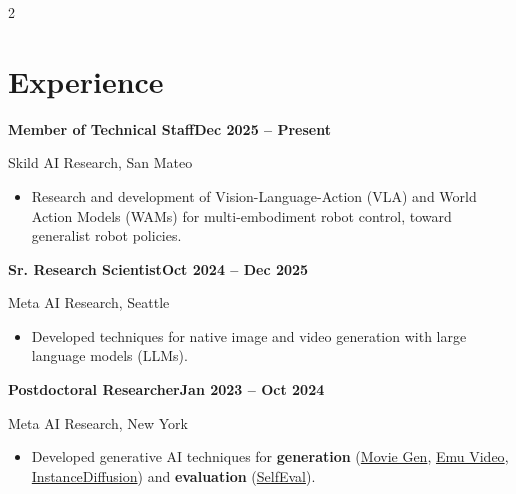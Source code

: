 \documentclass[10pt, letterpaper]{article}
\let\hrefWithoutArrow\href
\renewcommand{\href}[2]{\hrefWithoutArrow{#1}{#2}}
\newcommand{\job}[4]{{\bfseries #1}\hfill{\small\color{accent}\bfseries #3}\par{\color{muted}#2}\par\vspace{0.08cm}\begin{itemize}[leftmargin=0.4cm, topsep=0pt, itemsep=0pt]\item #4\end{itemize}\vspace{0.25cm}}
\begin{document}
\begin{paracol}{2}
\section{Experience}
\job{Member of Technical Staff}{Skild AI Research, San Mateo}{Dec 2025 -- Present}{Research and development of Vision-Language-Action (VLA) and World Action Models (WAMs) for multi-embodiment robot control, toward generalist robot policies.}
\job{Sr. Research Scientist}{Meta AI Research, Seattle}{Oct 2024 -- Dec 2025}{Developed techniques for native image and video generation with large language models (LLMs).}
\job{Postdoctoral Researcher}{Meta AI Research, New York}{Jan 2023 -- Oct 2024}{Developed generative AI techniques for \textbf{generation} (\href{https://ai.meta.com/research/movie-gen/}{Movie Gen}, \href{https://emu-video.metademolab.com/}{Emu Video}, \href{https://people.eecs.berkeley.edu/~xdwang/projects/InstDiff/}{InstanceDiffusion}) and \textbf{evaluation} (\href{https://arxiv.org/pdf/2311.10708.pdf}{\mbox{SelfEval}}).}

\end{paracol}
\end{document}
